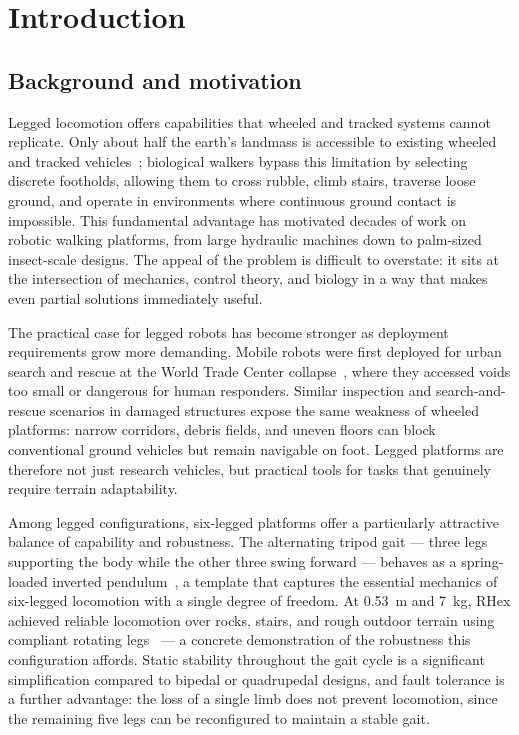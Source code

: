 \uomstartmainbody

\section{Introduction}

\subsection{Background and motivation}
Legged locomotion offers capabilities that wheeled and tracked systems cannot replicate. Only about half the earth's landmass is accessible to existing wheeled and tracked vehicles~\cite{raibert1986}; biological walkers bypass this limitation by selecting discrete footholds, allowing them to cross rubble, climb stairs, traverse loose ground, and operate in environments where continuous ground contact is impossible. This fundamental advantage has motivated decades of work on robotic walking platforms, from large hydraulic machines down to palm-sized insect-scale designs. The appeal of the problem is difficult to overstate: it sits at the intersection of mechanics, control theory, and biology in a way that makes even partial solutions immediately useful.

The practical case for legged robots has become stronger as deployment requirements grow more demanding. Mobile robots were first deployed for urban search and rescue at the World Trade Center collapse~\cite{murphy2004disaster}, where they accessed voids too small or dangerous for human responders. Similar inspection and search-and-rescue scenarios in damaged structures expose the same weakness of wheeled platforms: narrow corridors, debris fields, and uneven floors can block conventional ground vehicles but remain navigable on foot. Legged platforms are therefore not just research vehicles, but practical tools for tasks that genuinely require terrain adaptability.

Among legged configurations, six-legged platforms offer a particularly attractive balance of capability and robustness. The alternating tripod gait — three legs supporting the body while the other three swing forward — behaves as a spring-loaded inverted pendulum~\cite{full1999templates}, a template that captures the essential mechanics of six-legged locomotion with a single degree of freedom. At \SI{0.53}{\metre} and \SI{7}{\kilogram}, RHex achieved reliable locomotion over rocks, stairs, and rough outdoor terrain using compliant rotating legs~\cite{saranli2001rhex} — a concrete demonstration of the robustness this configuration affords. Static stability throughout the gait cycle is a significant simplification compared to bipedal or quadrupedal designs, and fault tolerance is a further advantage: the loss of a single limb does not prevent locomotion, since the remaining five legs can be reconfigured to maintain a stable gait.

